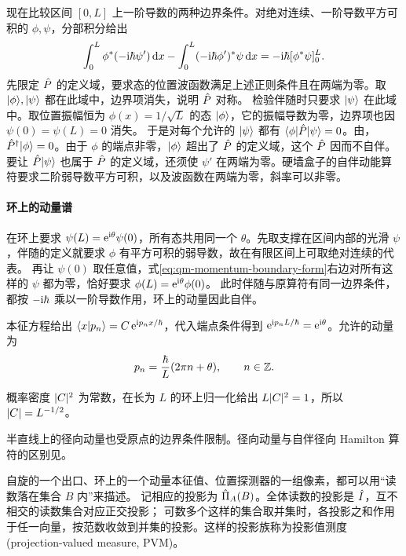 现在比较区间 $[0,L]$ 上一阶导数的两种边界条件。对绝对连续、一阶导数平方可积的 $\phi,\psi$，分部积分给出
\begin{equation}\label{eq:qm-momentum-boundary-form}
    \int_0^L \phi^\ast(-\mathrm{i}\hbar\psi')\mathop{}\!\mathrm{d} x
    - \int_0^L (-\mathrm{i}\hbar\phi')^\ast\psi\mathop{}\!\mathrm{d} x
    = -\mathrm{i}\hbar[\phi^\ast\psi]_0^L .
\end{equation}
先限定 $\hat{P}$ 的定义域，要求态的位置波函数满足上述正则条件且在两端为零。取 $\lvert\phi\rangle,\lvert\psi\rangle$ 都在此域中，边界项消失，说明 $\hat{P}$ 对称。
检验伴随时只要求 $\lvert\psi\rangle$ 在此域中。取位置振幅恒为 $\phi(x) = 1/\sqrt L$ 的态 $\lvert\phi\rangle$，它的振幅导数为零，边界项也因 $\psi(0) = \psi(L) = 0$ 消失。
于是对每个允许的 $\lvert\psi\rangle$ 都有 $\langle\phi\vert\hat{P}\vert\psi\rangle = 0$。由，$\hat{P}^\dagger\lvert\phi\rangle = 0$。由于 $\phi$ 的端点非零，$\lvert\phi\rangle$ 超出了 $\hat{P}$ 的定义域，这个 $\hat{P}$ 因而不自伴\cite{domains}。
要让 $\hat{P}\lvert\psi\rangle$ 也属于 $\hat{P}$ 的定义域，还须使 $\psi'$ 在两端为零。硬墙盒子的自伴动能算符要求二阶弱导数平方可积，以及波函数在两端为零，斜率可以非零。

\paragraph{环上的动量谱}
在环上要求 $\psi(L) = \mathop{}\!\mathrm{e}^{\mathrm{i}\theta}\psi(0)$，所有态共用同一个 $\theta$。先取支撑在区间内部的光滑 $\psi$，伴随的定义就要求 $\phi$ 有平方可积的弱导数，故在有限区间上可取绝对连续的代表。
再让 $\psi(0)$ 取任意值，式\eqref{eq:qm-momentum-boundary-form}右边对所有这样的 $\psi$ 都为零，恰好要求 $\phi(L) = \mathop{}\!\mathrm{e}^{\mathrm{i}\theta}\phi(0)$。
此时伴随与原算符有同一边界条件，都按 $-\mathrm{i}\hbar$ 乘以一阶导数作用，环上的动量因此自伴。

本征方程给出 $\langle x\vert p_n\rangle = C\mathop{}\!\mathrm{e}^{\mathrm{i} p_nx/\hbar}$，代入端点条件得到 $\mathop{}\!\mathrm{e}^{\mathrm{i} p_n L/\hbar} = \mathop{}\!\mathrm{e}^{\mathrm{i}\theta}$。允许的动量为
\begin{equation}
    p_n = \frac\hbar L(2\pi n + \theta),\qquad n \in \mathbb{Z}.
\end{equation}

概率密度 $\lvert C\rvert^2$ 为常数，在长为 $L$ 的环上归一化给出 $L\lvert C\rvert^2 = 1$，所以 $\lvert C\rvert = L^{-1/2}$。

半直线上的径向动量也受原点的边界条件限制。径向动量与自伴径向 Hamilton 算符的区别见。

\label{ss:qm-spectral-functions}
自旋的一个出口、环上的一个动量本征值、位置探测器的一组像素，都可以用“读数落在集合 $B$ 内”来描述。
记相应的投影为 $\hat{\Pi}_A(B)$。全体读数的投影是 $\hat{I}$，互不相交的读数集合对应正交投影；
可数多个这样的集合取并集时，各投影之和作用于任一向量，按范数收敛到并集的投影。这样的投影族称为投影值测度(projection-valued measure, PVM)。

